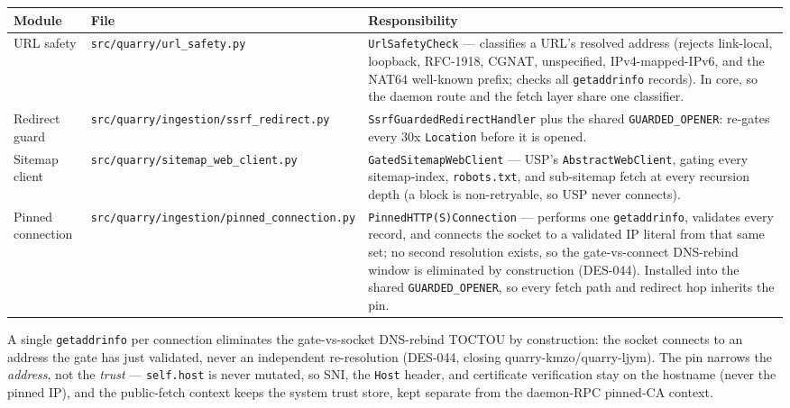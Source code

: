\documentclass[a4paper,10pt]{article}
\newcommand{\modpath}[1]{\texttt{src/quarry/#1}}
\begin{document}
\begin{center}
\begin{tabular}{llp{7cm}}
\toprule
\textbf{Module} & \textbf{File} & \textbf{Responsibility} \\
\midrule
URL safety     & \modpath{url\_safety.py}   & \texttt{UrlSafetyCheck}
                 --- classifies a URL's resolved address (rejects
                 link-local, loopback, RFC-1918, CGNAT, unspecified,
                 IPv4-mapped-IPv6, and the NAT64 well-known prefix;
                 checks all \texttt{getaddrinfo} records).  In core, so
                 the daemon route and the fetch layer share one
                 classifier. \\
Redirect guard & \modpath{ingestion/ssrf\_redirect.py} &
                 \texttt{SsrfGuardedRedirectHandler} plus the shared
                 \texttt{GUARDED\_OPENER}: re-gates every 30x
                 \texttt{Location} before it is opened. \\
Sitemap client & \modpath{sitemap\_web\_client.py} &
                 \texttt{GatedSitemapWebClient} --- USP's
                 \texttt{AbstractWebClient}, gating every sitemap-index,
                 \texttt{robots.txt}, and sub-sitemap fetch at every
                 recursion depth (a block is non-retryable, so USP
                 never connects). \\
Pinned connection & \modpath{ingestion/pinned\_connection.py} &
                 \texttt{PinnedHTTP(S)Connection} --- performs one
                 \texttt{getaddrinfo}, validates every record, and connects
                 the socket to a validated IP literal from that same set; no
                 second resolution exists, so the gate-vs-connect DNS-rebind
                 window is eliminated by construction (DES-044).  Installed
                 into the shared \texttt{GUARDED\_OPENER}, so every fetch path
                 and redirect hop inherits the pin. \\
\bottomrule
\end{tabular}
\end{center}

A single \texttt{getaddrinfo} per connection eliminates the
gate-vs-socket DNS-rebind TOCTOU by construction: the socket connects
to an address the gate has just validated, never an independent
re-resolution (DES-044, closing quarry-kmzo/quarry-ljym).  The pin
narrows the \emph{address}, not the \emph{trust} --- \texttt{self.host}
is never mutated, so SNI, the \texttt{Host} header, and certificate
verification stay on the hostname (never the pinned IP), and the
public-fetch context keeps the system trust store, kept separate from
the daemon-RPC pinned-CA context.
\end{document}
